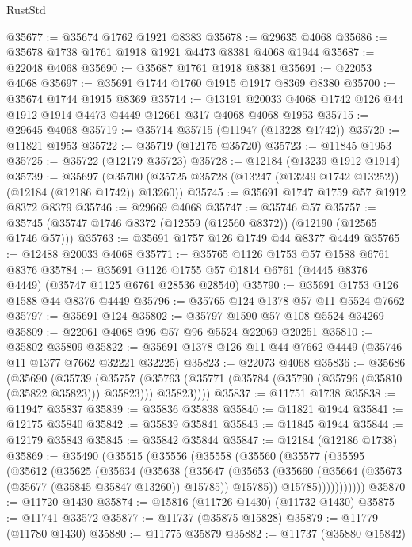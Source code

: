 \begin{lexlean}{RustStd}
\begin{coremodule}
@35677 := @35674 @1762 @1921 @8383
@35678 := @29635 @4068
@35686 := @35678 @1738 @1761 @1918 @1921 @4473 @8381 @4068 @1944
@35687 := @22048 @4068
@35690 := @35687 @1761 @1918 @8381
@35691 := @22053 @4068
@35697 := @35691 @1744 @1760 @1915 @1917 @8369 @8380
@35700 := @35674 @1744 @1915 @8369
@35714 := @13191 @20033 @4068 @1742 @126 @44 @1912 @1914 @4473 @4449 @12661 @317 @4068 @4068 @1953
@35715 := @29645 @4068
@35719 := @35714 @35715 (@11947 (@13228 @1742))
@35720 := @11821 @1953
@35722 := @35719 (@12175 @35720)
@35723 := @11845 @1953
@35725 := @35722 (@12179 @35723)
@35728 := @12184 (@13239 @1912 @1914)
@35739 := @35697
    (@35700 (@35725 @35728 (@13247 (@13249 @1742 @13252)) (@12184 (@12186 @1742)) @13260))
@35745 := @35691 @1747 @1759 @57 @1912 @8372 @8379
@35746 := @29669 @4068
@35747 := @35746 @57
@35757 := @35745 (@35747 @1746 @8372 (@12559 (@12560 @8372)) (@12190 (@12565 @1746 @57)))
@35763 := @35691 @1757 @126 @1749 @44 @8377 @4449
@35765 := @12488 @20033 @4068
@35771 := @35765 @1126 @1753 @57 @1588 @6761 @8376
@35784 := @35691 @1126 @1755 @57 @1814 @6761 (@4445 @8376 @4449) (@35747 @1125 @6761 @28536 @28540)
@35790 := @35691 @1753 @126 @1588 @44 @8376 @4449
@35796 := @35765 @124 @1378 @57 @11 @5524 @7662
@35797 := @35691 @124
@35802 := @35797 @1590 @57 @108 @5524 @34269
@35809 := @22061 @4068 @96 @57 @96 @5524 @22069 @20251
@35810 := @35802 @35809
@35822 := @35691 @1378 @126 @11 @44 @7662 @4449 (@35746 @11 @1377 @7662 @32221 @32225)
@35823 := @22073 @4068
@35836 := @35686
    (@35690
      (@35739
        (@35757
          (@35763 (@35771 (@35784 (@35790 (@35796 (@35810 (@35822 @35823))) @35823))) @35823))))
@35837 := @11751 @1738
@35838 := @11947 @35837
@35839 := @35836 @35838
@35840 := @11821 @1944
@35841 := @12175 @35840
@35842 := @35839 @35841
@35843 := @11845 @1944
@35844 := @12179 @35843
@35845 := @35842 @35844
@35847 := @12184 (@12186 @1738)
@35869 := @35490
    (@35515
      (@35556
        (@35558
          (@35560
            (@35577
              (@35595
                (@35612
                  (@35625
                    (@35634
                      (@35638
                        (@35647
                          (@35653
                            (@35660
                              (@35664 (@35673 (@35677 (@35845 @35847 @13260)) @15785))
                              @15785))
                          @15785)))))))))))
@35870 := @11720 @1430
@35874 := @15816 (@11726 @1430) (@11732 @1430)
@35875 := @11741 @33572
@35877 := @11737 (@35875 @15828)
@35879 := @11779 (@11780 @1430)
@35880 := @11775 @35879
@35882 := @11737 (@35880 @15842)

\end{coremodule}
\end{lexlean}
